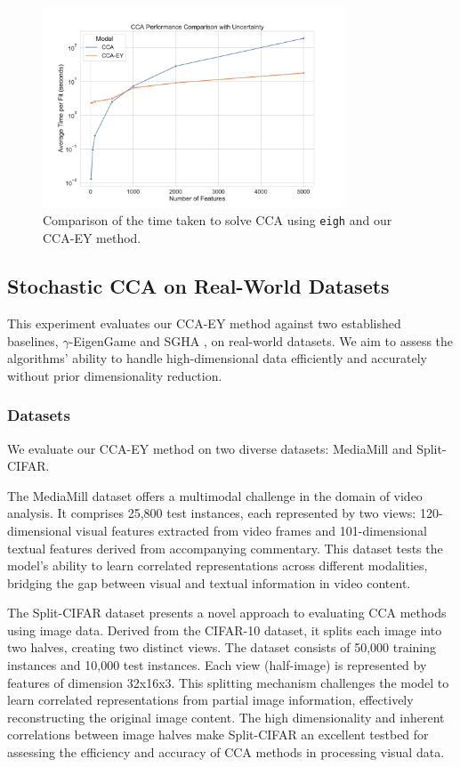 \begin{figure}
    \centering
    \includegraphics[width=0.8\textwidth]{figures/benchmarks/cca_comparison_log}
    \caption{Comparison of the time taken to solve CCA using \texttt{eigh} and our CCA-EY method.}
    \label{fig:cca-comparison}
\end{figure}

\subsection{Stochastic CCA on Real-World Datasets}
This experiment evaluates our CCA-EY method against two established baselines, $\gamma$-EigenGame \citep{gemp2022generalized} and SGHA \citep{chen2019constrained}, on real-world datasets. We aim to assess the algorithms' ability to handle high-dimensional data efficiently and accurately without prior dimensionality reduction.

\subsubsection{Datasets}
We evaluate our CCA-EY method on two diverse datasets: MediaMill and Split-CIFAR.

The MediaMill dataset \citep{gemert2008visual} offers a multimodal challenge in the domain of video analysis. It comprises 25,800 test instances, each represented by two views: 120-dimensional visual features extracted from video frames and 101-dimensional textual features derived from accompanying commentary. This dataset tests the model's ability to learn correlated representations across different modalities, bridging the gap between visual and textual information in video content.

The Split-CIFAR dataset \citep{meng2021online} presents a novel approach to evaluating CCA methods using image data. Derived from the CIFAR-10 dataset, it splits each image into two halves, creating two distinct views. The dataset consists of 50,000 training instances and 10,000 test instances. Each view (half-image) is represented by features of dimension 32x16x3. This splitting mechanism challenges the model to learn correlated representations from partial image information, effectively reconstructing the original image content. The high dimensionality and inherent correlations between image halves make Split-CIFAR an excellent testbed for assessing the efficiency and accuracy of CCA methods in processing visual data.

